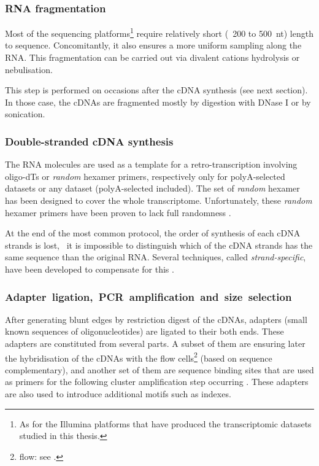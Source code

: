 \subsubsection{RNA fragmentation}

Most of the sequencing platforms\footnote{As for the Illumina platforms that have
produced the transcriptomic datasets studied in this thesis.} require relatively
short (\ie\ 200 to 500\ nt) length to sequence. Concomitantly, it also ensures
a more uniform sampling along the \gls{RNA}.
This fragmentation can be carried out via divalent cations hydrolysis or
nebulisation.\mybr\

This step is performed on occasions after the \gls{cDNA} synthesis
(see next section). In those case, the \glspl{cDNA} are fragmented mostly
by digestion with DNase I or by sonication.\mybr\

\subsubsection{Double-stranded cDNA synthesis}
The \gls{RNA} molecules are used as a template for a retro-transcription
involving oligo-dTs or \emph{random} hexamer primers, respectively only
for polyA-selected datasets or any dataset (polyA-selected included).
The set of \emph{random} hexamer has been designed to cover the whole
transcriptome. Unfortunately, these \emph{random} hexamer primers have been
proven to lack full randomness .\mybr\

At the end of the most common protocol, the order of synthesis of each \gls{cDNA}
strands is lost, \ie\ it is impossible to distinguish which of the \gls{cDNA}
strands has the same sequence than the original \gls{RNA}. Several techniques,
called \emph{strand-specific}, have been developed to compensate for this
.\label{strand-specific}\mybr\

\subsubsection{Adapter~ligation,~PCR~amplification~and~size~selection}

After generating blunt edges by restriction digest of the \glspl{cDNA}, adapters
(small known sequences of oligonucleotides) are ligated to their both ends.
These adapters are constituted from several parts. A subset of them are ensuring
later the hybridisation of the \glspl{cDNA} with the flow
cells\footnote{\Gls{flow}: see .} (based on sequence
complementary), and another set of them
are sequence binding sites that are used as primers for the following cluster
amplification step occurring . These adapters are also used to
introduce additional motifs such as indexes.\mybr\

